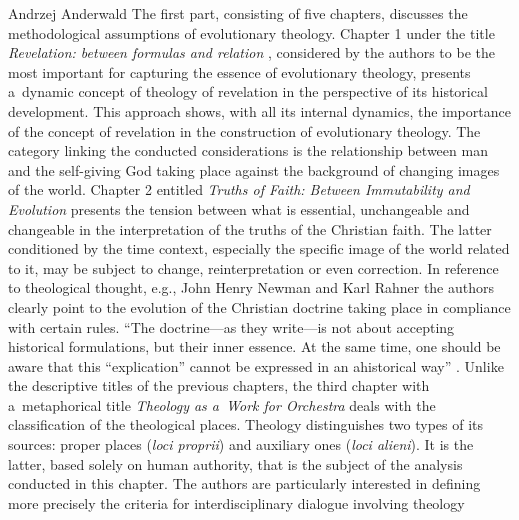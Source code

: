 \begin{newrevengenv}{Andrzej Anderwald}
The first part, consisting of five chapters, discusses the methodological assumptions of evolutionary theology. Chapter 1 under the title \textit{Revelation: between formulas and relation} 
\parencite*[][pp.16–37]{grygiel_teologia_2022}, %
 considered by the authors to be the most important for capturing the essence of evolutionary theology, presents a~dynamic concept of theology of revelation in the perspective of its historical development. This approach shows, with all its internal dynamics, the importance of the concept of revelation in the construction of evolutionary theology. The category linking the conducted considerations is the relationship between man and the self-giving God taking place against the background of changing images of the world. Chapter 2 entitled \textit{Truths of Faith: Between Immutability and Evolution} 
\parencite*[][pp.38–60]{grygiel_teologia_2022} %
 presents the tension between what is essential, unchangeable and changeable in the interpretation of the truths of the Christian faith. The latter conditioned by the time context, especially the specific image of the world related to it, may be subject to change, reinterpretation or even correction. In reference to theological thought, e.g., John Henry Newman 
\parencite*[][pp.43–44]{grygiel_teologia_2022} %
 and Karl Rahner 
\parencite*[][pp.50–51]{grygiel_teologia_2022} %
 the authors clearly point to the evolution of the Christian doctrine taking place in compliance with certain rules. ``The doctrine---as they write---is not about accepting historical formulations, but their inner essence. At the same time, one should be aware that this ``explication'' cannot be expressed in an ahistorical way'' 
\parencite*[][p.51]{grygiel_teologia_2022}. %
 Unlike the descriptive titles of the previous chapters, the third chapter with a~metaphorical title \textit{Theology as a~Work for Orchestra} 
\parencite*[][pp.61–84]{grygiel_teologia_2022} %
 deals with the classification of the theological places. Theology distinguishes two types of its sources: proper places (\textit{loci proprii}) and auxiliary ones (\textit{loci alieni}). It is the latter, based solely on human authority, that is the subject of the analysis conducted in this chapter. The authors are particularly interested in defining more precisely the criteria for interdisciplinary dialogue involving theology 

\end{newrevengenv}
